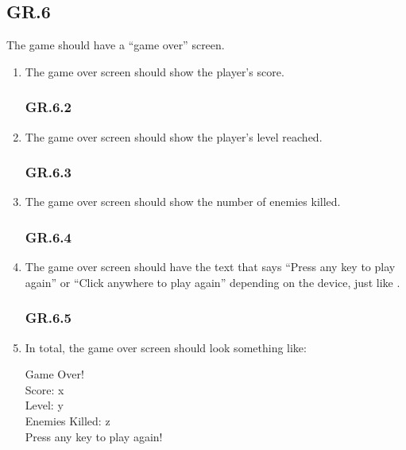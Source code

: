 \documentclass[12pt, letterpaper]{article}
\begin{document}
    \subsection*{GR.6}
    The game should have a ``game over'' screen. 
    \begin{enumerate}[label=]
        \subsubsection*{GR.6.1}
        \item The game over screen should show the player's score.
        \subsubsection*{GR.6.2}
        \item The game over screen should show the player's level reached. 
        \subsubsection*{GR.6.3}
        \item The game over screen should show the number of enemies killed. 
        \subsubsection*{GR.6.4}
        \item The game over screen should have the text that says ``Press any key to play again'' or ``Click anywhere to play again'' depending on the device, just like .
        \subsubsection*{GR.6.5}
        \item In total, the game over screen should look something like: 
        \begin{center}
            Game Over! \\
            Score: x \\
            Level: y \\
            Enemies Killed: z \\
            Press any key to play again!
        \end{center}
    \end{enumerate}    
\end{document}
